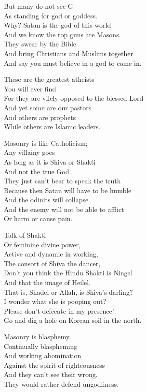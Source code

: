 \documentclass[
]{book}
\begin{document}
But many do not see G\\
As standing for god or goddess.\\
Why? Satan is the god of this world\\
And we know the top guns are Masons.\\
They swear by the Bible\\
And bring Christians and Muslims together\\
And say you must believe in a god to come in.

These are the greatest atheists\\
You will ever find\\
For they are vilely opposed to the blessed Lord\\
And yet some are our pastors\\
And others are prophets\\
While others are Islamic leaders.

Masonry is like Catholicism;\\
Any villainy goes\\
As long as it is Shiva or Shakti\\
And not the true God.\\
They just can't bear to speak the truth\\
Because then Satan will have to be humble\\
And the odinits will collapse\\
And the enemy will not be able to afflict\\
Or harm or cause pain.

Talk of Shakti\\
Or feminine divine power,\\
Active and dynamic in working,\\
The consort of Shiva the dancer,\\
Don't you think the Hindu Shakti is Ningal\\
And that the image of Heilel,\\
That is, Shadel or Allah, is Shiva's darling?\\
I wonder what she is pooping out?\\
Please don't defecate in my presence!\\
Go and dig a hole on Korean soil in the north.

Masonry is blasphemy,\\
Continually blaspheming\\
And working abomination\\
Against the spirit of righteousness\\
And they can't see their wrong.\\
They would rather defend ungodliness.
\end{document}

